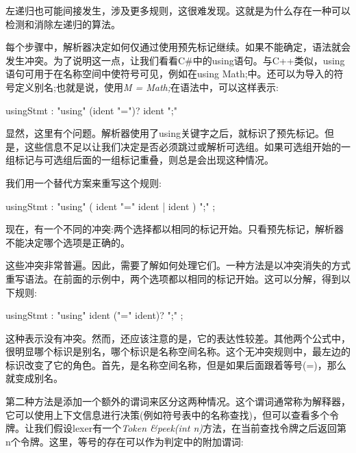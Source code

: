左递归也可能间接发生，涉及更多规则，这很难发现。这就是为什么存在一种可以检测和消除左递归的算法。\par

每个步骤中，解析器决定如何仅通过使用预先标记继续。如果不能确定，语法就会发生冲突。为了说明这一点，让我们看看C\#中的using语句。与C++类似，using语句可用于在名称空间中使符号可见，例如在using Math;中。还可以为导入的符号定义别名;也就是说，使用\textit{M = Math;}在语法中，可以这样表示:\par

\begin{tcolorbox}[colback=white,colframe=black]
usingStmt : "using" (ident "=")? ident ";"
\end{tcolorbox}

显然，这里有个问题。解析器使用了using关键字之后，就标识了预先标记。但是，这些信息不足以让我们决定是否必须跳过或解析可选组。如果可选组开始的一组标记与可选组后面的一组标记重叠，则总是会出现这种情况。\par

我们用一个替代方案来重写这个规则:\par


\begin{tcolorbox}[colback=white,colframe=black]
usingStmt : "using" ( ident "=" ident | ident ) ";" ;
\end{tcolorbox}

现在，有一个不同的冲突:两个选择都以相同的标记开始。只看预先标记，解析器不能决定哪个选项是正确的。\par

这些冲突非常普遍。因此，需要了解如何处理它们。一种方法是以冲突消失的方式重写语法。在前面的示例中，两个选项都以相同的标记开始。这可以分解，得到以下规则:\par

\begin{tcolorbox}[colback=white,colframe=black]
usingStmt : "using" ident ("=" ident)? ";" ;
\end{tcolorbox}

这种表示没有冲突。然而，还应该注意的是，它的表达性较差。其他两个公式中，很明显哪个标识是别名，哪个标识是名称空间名称。这个无冲突规则中，最左边的标识改变了它的角色。首先，是名称空间名称，但是如果后面跟着等号(=)，那么就变成别名。\par

第二种方法是添加一个额外的谓词来区分这两种情况。这个谓词通常称为解释器，它可以使用上下文信息进行决策(例如符号表中的名称查找)，但可以查看多个令牌。让我们假设lexer有一个\textit{Token \&peek(int n)}方法，在当前查找令牌之后返回第n个令牌。这里，等号的存在可以作为判定中的附加谓词:\par


